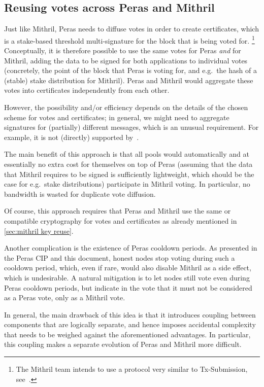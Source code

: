 \subsection{Reusing votes across Peras and Mithril}\label{sec:mithril reuse votes}
Just like Mithril, Peras needs to diffuse votes in order to create certificates, which is a stake-based threshold multi-signature for the block that is being voted for.%
\footnote{The Mithril team intends to use a protocol very similar to Tx-Submission, see~\cite{dmq-cip}.}
Conceptually, it is therefore possible to use the same votes for Peras \emph{and} for Mithril, adding the data to be signed for both applications to individual votes (concretely, the point of the block that Peras is voting for, and e.g.\ the hash of a (stable) stake distribution for Mithril).
Peras and Mithril would aggregate these votes into certificates independently from each other.

However, the possibility and/or efficiency depends on the details of the chosen scheme for votes and certificates; in general, we might need to aggregate signatures for (partially) different messages, which is an unusual requirement.
For example, it is not (directly) supported by~\cite{peras-cert-report}.

The main benefit of this approach is that all pools would automatically and at essentially no extra cost for themselves on top of Peras (assuming that the data that Mithril requires to be signed is sufficiently lightweight, which should be the case for e.g.\ stake distributions) participate in Mithril voting.
In particular, no bandwidth is wasted for duplicate vote diffusion.

Of course, this approach requires that Peras and Mithril use the same or compatible cryptography for votes and certificates as already mentioned in \cref{sec:mithril key reuse}.

Another complication is the existence of Peras cooldown periods.
As presented in the Peras CIP \parencite{peras-cip} and this document, honest nodes stop voting during such a cooldown period, which, even if rare, would also disable Mithril as a side effect, which is undesirable.
A natural mitigation is to let nodes still vote even during Peras cooldown periods, but indicate in the vote that it must not be considered as a Peras vote, only as a Mithril vote.

In general, the main drawback of this idea is that it introduces coupling between components that are logically separate, and hence imposes accidental complexity that needs to be weighed against the aforementioned advantages.
In particular, this coupling makes a separate evolution of Peras and Mithril more difficult.

